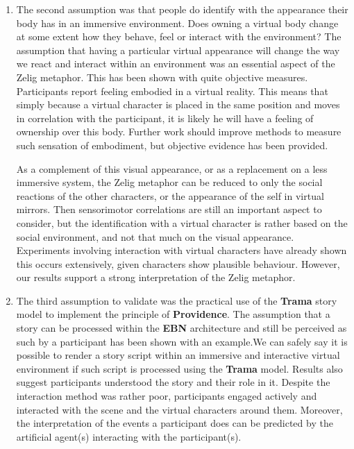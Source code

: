 \documentclass[
		twoside,openright,titlepage,numbers=noenddot,manychapters,
		headinclude,%
                footinclude=false,cleardoublepage=empty,
                BCOR=5mm,
		fontsize=11pt, %
                 enabledeprecatedfontcommands]{scrreprt}
\begin{document}
\begin{enumerate}
   
   \item The second assumption was that  people do identify with the appearance their body has in an immersive environment. Does owning a virtual body change at some extent how they behave, feel or interact with the environment? The assumption that having a particular virtual appearance will change the way we react and interact within an environment was an essential aspect of the Zelig metaphor. This has been shown with quite objective measures. Participants report feeling embodied in a virtual reality. This means that simply because a virtual character is placed in the same position and moves in correlation with the participant,  it is likely he will have a feeling of ownership over this body.  Further work should improve methods to measure such sensation of embodiment, but objective evidence has been provided. 
   
   As a complement of this visual appearance, or as a replacement on a less immersive system, the Zelig metaphor can be reduced to only the social reactions of the other characters, or the appearance of the self in virtual mirrors. Then sensorimotor correlations are still an important aspect to consider, but the identification with a virtual character is rather based on the social environment, and not that much on the visual appearance.  Experiments involving interaction with virtual characters have already shown this occurs extensively, given characters show plausible behaviour. However, our results support a strong interpretation of the Zelig metaphor.
   


   
   \item The third assumption to validate was the practical use of the \textbf{Trama} story model to implement the principle of \textbf{Providence}. The assumption that a story can be processed within the \textbf{EBN} architecture and still be perceived as such by a participant has been shown with an example.We can safely say it is possible to render a story script within an immersive and interactive  virtual environment if such script is processed using the \textbf{Trama} model. Results also suggest participants understood the story and their role in it. Despite the interaction method was rather poor, participants engaged actively and interacted with the scene and the virtual characters around them. Moreover, the interpretation of the events a participant does can be predicted by the artificial agent(s) interacting with the participant(s). 

 \end{enumerate}
\end{document}
